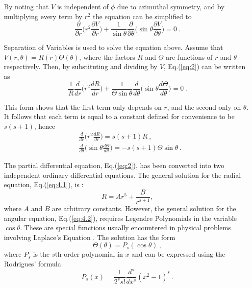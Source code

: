 \documentclass[a4paper]{jpconf}
\begin{document}
By noting that $V$ is independent of $\phi$ due to azimuthal symmetry, and by multiplying every term by $r^2$ the equation can be simplified to
\begin{equation}
\frac{\partial}{\partial r}\bigg(r^2 \frac{\partial V}{\partial r}\bigg) + \frac{1}{\sin \theta}\frac{\partial}{\partial \theta}\bigg(\sin \theta \frac{\partial V}{\partial \theta}\bigg) = 0~.
\label{eq:2}
\end{equation}

Separation of Variables is used to solve the equation above. Assume that $V(r,\theta) = R(r)\Theta(\theta)$, where the factors $R$ and $\Theta$ are functions of $r$ and $\theta$ respectively. Then, by substituting and dividing by $V$, Eq.(\ref{eq:2}) can be written as 
\begin{equation}
\frac{1}{R}\frac{d}{dr}\bigg(r^2 \frac{dR}{dr}\bigg) + \frac{1}{\Theta \sin \theta}\frac{d}{d \theta}\bigg(\sin \theta \frac{d \Theta }{d \theta}\bigg) = 0~.
\label{eq:3}
\end{equation}

This form shows that the first term only depends on $r$, and the second only on $\theta$. It follows that  each term is equal to a constant defined for convenience to be $s(s+1)$, hence
\begin{subequations}
\begin{align}
&\frac{d}{dr}\bigg(r^2 \frac{dR}{dr}\bigg) = s (s+1) R~, \label{eq:4.1}\\ 
&\frac{d}{d \theta}\bigg(\sin \theta \frac{d \Theta}{d \theta}\bigg) = - s (s+1) \Theta \sin \theta~. \label{eq:4.2}
\end{align}
\label{eq:4}
\end{subequations} 

The partial differential equation, Eq.(\ref{eq:2}), has been converted into two independent ordinary differential equations. The general solution for the radial equation, Eq.(\ref{eq:4.1}), is \cite{RHB-MathematicalMethods}:
\begin{equation}
R = Ar^5 + \frac{B}{r^{s+1}},
\end{equation} where $A$ and $B$ are arbitrary constants. However, the general solution for the angular equation, Eq.(\ref{eq:4.2}), requires Legendre Polynomials in the variable $\cos \theta$. These are special functions usually encountered in physical problems involving Laplace's Equation \cite{RHB-MathematicalMethods}. The solution has the form
\begin{equation}
\Theta(\theta) = P_{s}(\cos \theta)~,
\label{eq:5}
\end{equation} where $P_s$ is the $s$th-order polynomial in $x$ and can be expressed using the Rodrigues' formula \cite{RHB-MathematicalMethods}
\begin{equation}
P_s(x) = \frac{1}{2^s s!} \frac{d^s}{dx^s}(x^2 -1)^s~.
\end{equation}
\end{document}
